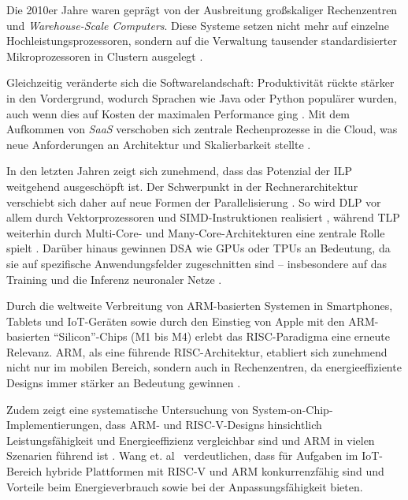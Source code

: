 Die 2010er Jahre waren geprägt von der Ausbreitung großskaliger Rechenzentren und \textit{Warehouse-Scale Computers}. Diese Systeme setzen nicht mehr auf einzelne Hochleistungsprozessoren, sondern auf die Verwaltung tausender standardisierter Mikroprozessoren in Clustern ausgelegt \parencites[S.~6]{hennessy_computer_2011}[S.~158]{kanev_profiling_2015}[S.~29]{mars_heterogeneity_2011}.

Gleichzeitig veränderte sich die Softwarelandschaft: Produktivität rückte stärker in den Vordergrund, wodurch Sprachen wie Java oder Python populärer wurden, auch wenn dies auf Kosten der maximalen Performance ging \parencite[S.~2]{hennessy_computer_2011}. Mit dem Aufkommen von \textit{\ac{SaaS}} verschoben sich zentrale Rechenprozesse in die Cloud, was neue Anforderungen an Architektur und Skalierbarkeit stellte \parencites[S.~158]{kanev_profiling_2015}[S.~29]{mars_heterogeneity_2011}.

In den letzten Jahren zeigt sich zunehmend, dass das Potenzial der \ac{ILP} weitgehend ausgeschöpft ist. Der Schwerpunkt in der Rechnerarchitektur verschiebt sich daher auf neue Formen der Parallelisierung \parencite[S.~10]{hennessy_computer_2019}. So wird \ac{DLP} vor allem durch Vektorprozessoren und \ac{SIMD}-Instruktionen realisiert \parencite[S.~1]{israel_high_2024}, während \ac{TLP} weiterhin durch Multi-Core- und Many-Core-Architekturen eine zentrale Rolle spielt \parencite[S.~10]{hennessy_computer_2019}. Darüber hinaus gewinnen \ac{DSA} wie GPUs oder \ac{TPU}s an Bedeutung, da sie auf spezifische Anwendungsfelder zugeschnitten sind – insbesondere auf das Training und die Inferenz neuronaler Netze \parencite[S.~10]{hennessy_computer_2019}.

Durch die weltweite Verbreitung von ARM-basierten Systemen in Smartphones, Tablets und \ac{IoT}-Geräten sowie durch den Einstieg von Apple mit den ARM-basierten \enquote{Silicon}-Chips (M1 bis M4) \parencite[S.~1]{hubner_apple_2025} erlebt das \ac{RISC}-Paradigma eine erneute Relevanz. ARM, als eine führende \ac{RISC}-Architektur, etabliert sich zunehmend nicht nur im mobilen Bereich, sondern auch in Rechenzentren, da energieeffiziente Designs immer stärker an Bedeutung gewinnen \parencite[S.~817]{rahman_redefining_2024}.

Zudem zeigt eine systematische Untersuchung von System-on-Chip-Implementierungen, dass ARM- und RISC-V-Designs hinsichtlich Leistungsfähigkeit und Energieeffizienz vergleichbar sind und ARM in vielen Szenarien führend ist \parencite[S.~12771]{suarez_comprehensive_2024}. Wang et. al~\cite{wang_fann--mcu_2020} verdeutlichen, dass für Aufgaben im \ac{IoT}-Bereich hybride Plattformen mit RISC-V und ARM konkurrenzfähig sind und Vorteile beim Energieverbrauch sowie bei der Anpassungsfähigkeit bieten. 

